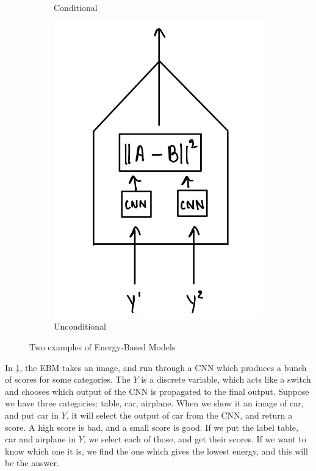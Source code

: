 \begin{figure}[htb]
\begin{subfigure}[b]{0.2\textwidth}
        \caption{Conditional}
        \label{fig:energybasedmodel1}
    \end{subfigure}
    \begin{subfigure}[b]{0.2\textwidth}
        \includegraphics[width=\textwidth]{figs/EBM7-2.jpg}
        \caption{Unconditional}
        \label{fig:energybasedmodel2}
    \end{subfigure}
    \caption{Two examples of Energy-Based Models}\label{fig:Example2}
\end{figure}

In \cref{fig:energybasedmodel1}, the EBM takes an image, and run through a CNN which produces a bunch of scores for some categories. 
The $Y$ is a discrete variable, which acts like a switch and chooses which output of the CNN is propagated to the final output. 
Suppose we have three categories: table, car, airplane. 
When we show it an image of car, and put car in $Y$, it will select the output of car from the CNN, and return a score. A high score is bad, and a small score is good. 
If we put the label table, car and airplane in $Y$, we select each of those, and get their scores. 
If we want to know which one it is, we find the one which gives the lowest energy, and this will be the answer.

